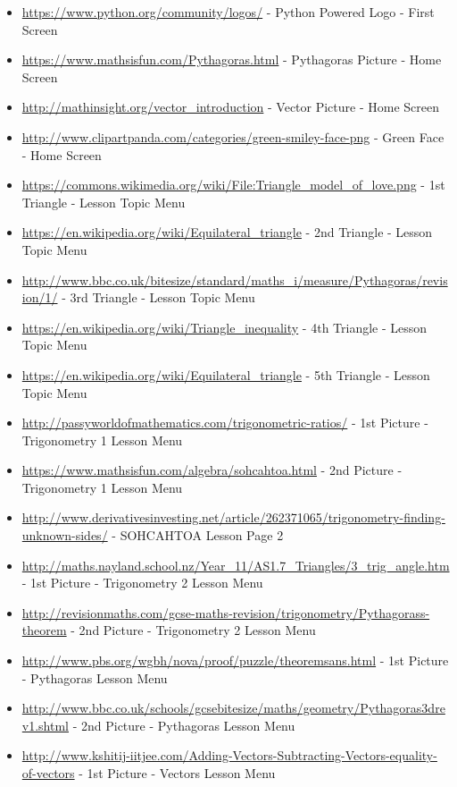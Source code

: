\begin{itemize}
	\item \url{https://www.python.org/community/logos/} - Python Powered Logo - First Screen
	\item \url{https://www.mathsisfun.com/Pythagoras.html} - Pythagoras Picture - Home Screen
	\item \url{http://mathinsight.org/vector_introduction} - Vector Picture - Home Screen
	\item \url{http://www.clipartpanda.com/categories/green-smiley-face-png} - Green Face - Home Screen
	\item \url{https://commons.wikimedia.org/wiki/File:Triangle_model_of_love.png} - 1st Triangle - Lesson Topic Menu
	\item \url{https://en.wikipedia.org/wiki/Equilateral_triangle} - 2nd Triangle - Lesson Topic Menu
	\item \url{http://www.bbc.co.uk/bitesize/standard/maths_i/measure/Pythagoras/revision/1/} - 3rd Triangle - Lesson Topic Menu
	\item \url{https://en.wikipedia.org/wiki/Triangle_inequality} - 4th Triangle - Lesson Topic Menu
	\item \url{https://en.wikipedia.org/wiki/Equilateral_triangle} - 5th Triangle - Lesson Topic Menu
	\item \url{http://passyworldofmathematics.com/trigonometric-ratios/} - 1st Picture - Trigonometry 1 Lesson Menu
	\item \url{https://www.mathsisfun.com/algebra/sohcahtoa.html} - 2nd Picture - Trigonometry 1 Lesson Menu
	\item \url{http://www.derivativesinvesting.net/article/262371065/trigonometry-finding-unknown-sides/} - SOHCAHTOA Lesson Page 2
	\item \url{http://maths.nayland.school.nz/Year_11/AS1.7_Triangles/3_trig_angle.htm} - 1st Picture - Trigonometry 2 Lesson Menu
	\item \url{http://revisionmaths.com/gcse-maths-revision/trigonometry/Pythagorass-theorem} - 2nd Picture - Trigonometry 2 Lesson Menu
	\item \url{http://www.pbs.org/wgbh/nova/proof/puzzle/theoremsans.html} - 1st Picture - Pythagoras Lesson Menu
	\item \url{http://www.bbc.co.uk/schools/gcsebitesize/maths/geometry/Pythagoras3drev1.shtml} - 2nd Picture - Pythagoras Lesson Menu
	\item \url{http://www.kshitij-iitjee.com/Adding-Vectors-Subtracting-Vectors-equality-of-vectors} - 1st Picture - Vectors Lesson Menu

\end{itemize}
